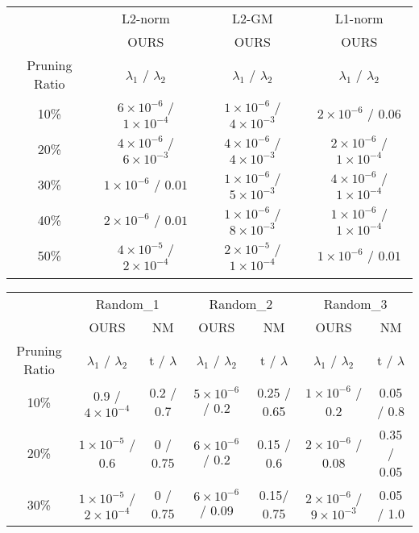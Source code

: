 \begin{table*}[h]
\centering 
\scriptsize
\begin{tabular}{c|c|c|c}\Xhline{2\arrayrulewidth}
\multirow{2}{*}{Criterion} & L2-norm& L2-GM & L1-norm\\ \cline{2-4} 
& OURS& OURS& OURS\\ \hline
Pruning Ratio& $\lambda_1$ / $\lambda_2$  & $\lambda_1$ / $\lambda_2$  & $\lambda_1$ / $\lambda_2$  \\\Xhline{2\arrayrulewidth}
10\%  & $6\times10^{-6}$ / $1\times10^{-4}$ & $1\times10^{-6}$ / $4\times10^{-3}$ & $2\times10^{-6}$ / $0.06$  \\ \hline
20\%  & $4\times10^{-6}$ / $6\times10^{-3}$ & $4\times10^{-6}$ / $4\times10^{-3}$ & $2\times10^{-6}$ / $1\times10^{-4}$ \\ \hline
30\%  & $1\times10^{-6}$ / $0.01$           & $1\times10^{-6}$ / $5\times10^{-3}$ & $4\times10^{-6}$ / $1\times10^{-4}$ \\ \hline
40\%  & $2\times10^{-6}$ / $0.01$           & $1\times10^{-6}$ / $8\times10^{-3}$ & $1\times10^{-6}$ / $1\times10^{-4}$ \\ \hline
50\%  & $4\times10^{-5}$ / $2\times10^{-4}$ & $2\times10^{-5}$ / $1\times10^{-4}$ & $1\times10^{-6}$ / $0.01$  \\ \Xhline{2\arrayrulewidth}
\end{tabular}%
\vspace{4mm}
\begin{tabular}{c|c|c|c|c|c|c}\Xhline{2\arrayrulewidth}
\multirow{2}{*}{Criterion} & \multicolumn{2}{c|}{Random\_1}& \multicolumn{2}{c|}{Random\_2}& \multicolumn{2}{c}{Random\_3}\\ \cline{2-7} 
    & OURS& NM& OURS& NM& OURS& NM\\ \hline
Pruning Ratio& $\lambda_1$ / $\lambda_2$ & t / $\lambda$ & $\lambda_1$ / $\lambda_2$ & t / $\lambda$ & $\lambda_1$ / $\lambda_2$ & t / $\lambda$ \\ \Xhline{2\arrayrulewidth}
10\%& 0.9 / $4\times10^{-4}$& 0.2 / 0.7   & $5\times10^{-6}$ / 0.2& 0.25 / 0.65     & $1\times10^{-6}$ / 0.2  & 0.05 / 0.8\\ \hline
20\%& $1\times10^{-5}$ / 0.6& 0 / 0.75    & $6\times10^{-6}$ / 0.2& 0.15 / 0.6& $2\times10^{-6}$ / 0.08 & 0.35 / 0.05 \\ \hline
30\%& $1\times10^{-5}$ / $2\times10^{-4}$ & 0 / 0.75    & $6\times10^{-6}$ / 0.09& 0.15/ 0.75& $2\times10^{-6}$ / $9\times10^{-3}$   & 0.05 / 1.0  \\ \hline

\end{tabular}
\end{table*}
